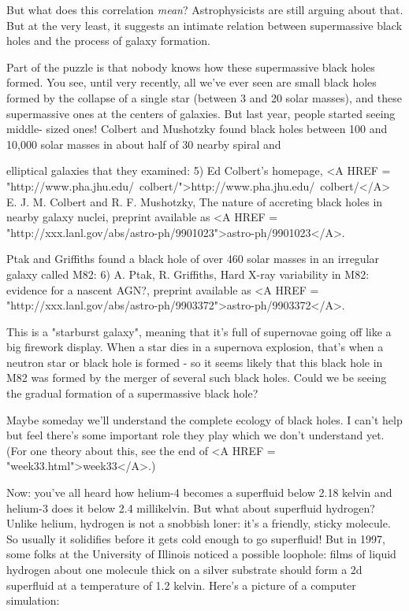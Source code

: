 But what does this correlation \emph{mean}?  Astrophysicists are still
arguing about that.  But at the very least, it suggests an intimate
relation between supermassive black holes and the process of galaxy
formation.  

Part of the puzzle is that nobody knows how these supermassive
black holes formed.  You see, until very recently, all we've ever 
seen are small black holes formed by the collapse of a single star
(between 3 and 20 solar masses), and these supermassive ones at the
centers of galaxies.  But last year, people started seeing middle-
sized ones!  Colbert and Mushotzky found black holes between 100 
and 10,000 solar masses in about half of 30 nearby spiral and

elliptical galaxies that they examined:
5) Ed Colbert's homepage, <A HREF = "http://www.pha.jhu.edu/~colbert/">http://www.pha.jhu.edu/~colbert/</A>
E. J. M. Colbert and R. F. Mushotzky, The nature of accreting black 
holes in nearby galaxy nuclei, preprint available as 
<A HREF = "http://xxx.lanl.gov/abs/astro-ph/9901023">astro-ph/9901023</A>.

Ptak and Griffiths found a black hole of over 460 solar masses in
an irregular galaxy called M82:
6) A. Ptak, R. Griffiths, Hard X-ray variability in M82: evidence 
for a nascent AGN?, preprint available as <A HREF = "http://xxx.lanl.gov/abs/astro-ph/9903372">astro-ph/9903372</A>.

This is a "starburst galaxy", meaning that it's full of supernovae going 
off like a big firework display.  When a star dies in a supernova explosion, 
that's when a neutron star or black hole is formed - so it seems likely 
that this black hole in M82 was formed by the merger of several such 
black holes.  Could we be seeing the gradual formation of a supermassive
black hole?  

Maybe someday we'll understand the complete ecology of black holes.
I can't help but feel there's some important role they play which we
don't understand yet.  (For one theory about this, see the end of <A HREF = "week33.html">week33</A>.)

Now: you've all heard how helium-4 becomes a superfluid below 2.18 
kelvin and helium-3 does it below 2.4 millikelvin.   But what about
superfluid hydrogen?  Unlike helium, hydrogen is not a snobbish loner: 
it's a friendly, sticky molecule.  So usually it solidifies before it 
gets cold enough to go superfluid!   But in 1997, some folks at the 
University of Illinois noticed a possible loophole: films of liquid 
hydrogen about one molecule thick on a silver substrate should form 
a 2d superfluid at a temperature of 1.2 kelvin.   Here's a picture 
of a computer simulation:

